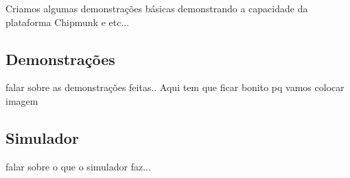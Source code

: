 Criamos algumas demonstrações básicas demonstrando a capacidade da plataforma Chipmunk e etc...

\subsection{Demonstrações}

falar sobre as demonstrações feitas.. Aqui tem que ficar bonito pq vamos colocar imagem

\subsection{Simulador}

falar sobre o que o simulador faz... 
